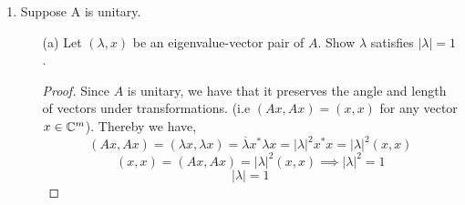\documentclass{article}
\begin{document}
\begin{enumerate}
\begin{proof}

By the property of $A$ being hermitian, that we can write any vector, $x \in \C_m, x \neq \vec{0}$ as the linear combination of the orthonormal eigenvectors of $A$, $u_i$. 
\[
    x = \alpha_1u_1 + \cdots + \alpha_mu_m
\]
We then look the inner product, $(Ax, x)$. 
\[
    Ax = A(\alpha_1u_1 + \cdots + \alpha_mu_m) = \lambda_1\alpha_1u_1 + \cdots + \lambda_m\alpha_mu_m
\]
\[
    (Ax)^* = \overline{\lambda_1\alpha_1} u_1^* + \cdots + \overline{\lambda_m\alpha_m}u_m^*
\]
\[
    (Ax, x) = (\overline{\lambda_1\alpha_1} u_1^* + \cdots + \overline{\lambda_m\alpha_m}u_m^*)(\alpha_1u_1 + \cdots + \alpha_mu_m)
\]
Here by the property of an orthonormal vector set, we have that $u_i^*u_j = 0$ if $i \neq j$ and $= 1$ if $i = j$.
\[
    (Ax, x) = \overline{\lambda_1\alpha_1}\alpha_1 + \cdots + \overline{\lambda_m\alpha_m}\alpha_m = \sum_{i=1}^m \lambda_i |\alpha_i|^2
\]
Of course, $|\alpha_i|^2$ is a strictly positive value. So for $(Ax, x) < 0$ we need at least one $\lambda_i < 0$. In fact, it is the case that if even one $\lambda_i < 0$ that $(Ax, x) \ngtr 0$ for all $x \in \C^m$. To prove that $(Ax, x) > 0, \forall x \in \C^m$, we take the case of only the smallest $\lambda_i$, $\lambda_k < 0$ (i.e. $|\lambda_k| < |\lambda_i| , \forall \lambda_i \in (\Lambda(A) - \{\lambda_k\})$). We can show by counter-example
\[
    \lambda_k < 0, x \in \C^m, x = \alpha_1u_1 + \cdots + \alpha_mu_m
\]
\[
    (Ax, x) = \lambda_k|\alpha_k|^2 + \sum_{i = 1, i\neq k}^m \lambda_i|\alpha_i|^2 
\]
\[
    \exists x_* \in \C^m, \text{ such that } |\alpha_k|^2 = \frac{1}{|\lambda_k|}\sum_{i = 1, i \neq k}^m \lambda_i|\alpha_i|^2 + 1
\]
\[
    (Ax_*, x_*) = \lambda_k < 0, \text{ by construction.}
\]
We have then that if $(Ax, x) < 0$, then $\lambda_i < 0$, and if $\lambda_i < 0$, then $\exists x \in \C^m$ such that $(Ax, x) < 0$. So if $A$ is positive definite if and only if all eigenvalues of $A$ are positive. 
\end{proof} %

\item Suppose A is unitary.

    \begin{enumerate}
    
    \item[(a)] Let $(\lambda, x)$ be an eigenvalue-vector pair of $A$. Show $\lambda$ satisfies $|\lambda| = 1$.
    \begin{proof}
        Since $A$ is unitary, we have that it preserves the angle and length of vectors under transformations. (i.e $(Ax, Ax) = (x, x)$ for any vector $x \in \C^m$). Thereby we have, 
\[
    (Ax, Ax) = (\lambda x, \lambda x) = \overline{\lambda}x^* \lambda x = |\lambda|^2 x^* x = |\lambda|^2 (x, x)
\]
\[
    (x, x) = (Ax, Ax) = |\lambda|^2(x, x) \implies |\lambda|^2 = 1
\]
\[
    |\lambda| = 1
\]
    \end{proof}


\end{enumerate}
\end{enumerate}
\end{document}
